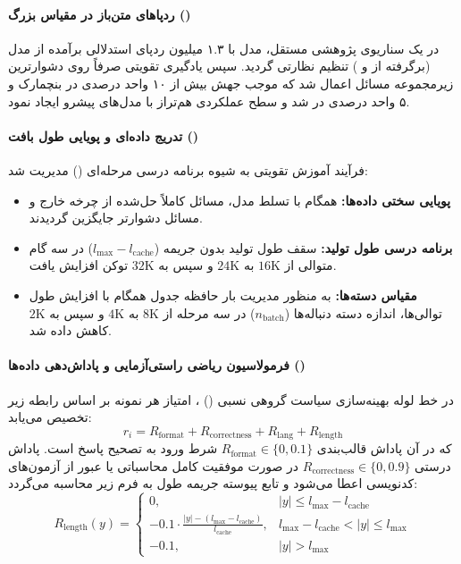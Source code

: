 \paragraph*{ردپاهای متن‌باز در مقیاس بزرگ ()}
در یک سناریوی پژوهشی مستقل، مدل  با ۱.۳ میلیون ردپای استدلالی برآمده از مدل  (برگرفته از  و ) تنظیم نظارتی گردید. سپس یادگیری تقویتی صرفاً روی دشوارترین زیرمجموعه مسائل اعمال شد که موجب جهش بیش از ۱۰ واحد درصدی در بنچمارک  و ۵ واحد درصدی در  شد و سطح عملکردی هم‌تراز با مدل‌های پیشرو ایجاد نمود.

\paragraph*{تدریج داده‌ای و پویایی طول بافت ()}
فرآیند آموزش تقویتی به شیوه برنامه درسی مرحله‌ای () مدیریت شد:
\begin{itemize}
    \item \textbf{پویایی سختی داده‌ها:} همگام با تسلط مدل، مسائل کاملاً حل‌شده از چرخه خارج و مسائل دشوارتر جایگزین گردیدند.
    \item \textbf{برنامه درسی طول تولید:} سقف طول تولید بدون جریمه ($l_{\max} - l_{\text{cache}}$) در سه گام متوالی از $16\text{K}$ به $24\text{K}$ و سپس به $32\text{K}$ توکن افزایش یافت.
    \item \textbf{مقیاس دسته‌ها:} به منظور مدیریت بار حافظه جدول  همگام با افزایش طول توالی‌ها، اندازه دسته دنباله‌ها ($n_{\text{batch}}$) در سه مرحله از $8\text{K}$ به $4\text{K}$ و سپس به $2\text{K}$ کاهش داده شد.
\end{itemize}

\paragraph*{فرمولاسیون ریاضی راستی‌آزمایی و پاداش‌دهی داده‌ها ()}
در خط لوله بهینه‌سازی سیاست گروهی نسبی () \cite{shao2024deepseekmath, yu2025dapo}، امتیاز هر نمونه بر اساس رابطه زیر تخصیص می‌یابد:
\begin{equation}
    r_i = R_{\text{format}} + R_{\text{correctness}} + R_{\text{lang}} + R_{\text{length}}
\end{equation}
که در آن پاداش قالب‌بندی $R_{\text{format}} \in \{0, 0.1\}$ شرط ورود به تصحیح پاسخ است. پاداش درستی $R_{\text{correctness}} \in \{0, 0.9\}$ در صورت موفقیت کامل محاسباتی یا عبور از آزمون‌های کدنویسی اعطا می‌شود و تابع پیوسته جریمه طول به فرم زیر محاسبه می‌گردد:
\begin{equation}
    R_{\text{length}}(y) = \begin{cases} 
        0, & |y| \le l_{\max} - l_{\text{cache}} \\ 
        -0.1 \cdot \frac{|y| - (l_{\max} - l_{\text{cache}})}{l_{\text{cache}}}, & l_{\max} - l_{\text{cache}} < |y| \le l_{\max} \\ 
        -0.1, & |y| > l_{\max} 
    \end{cases}
\end{equation}

